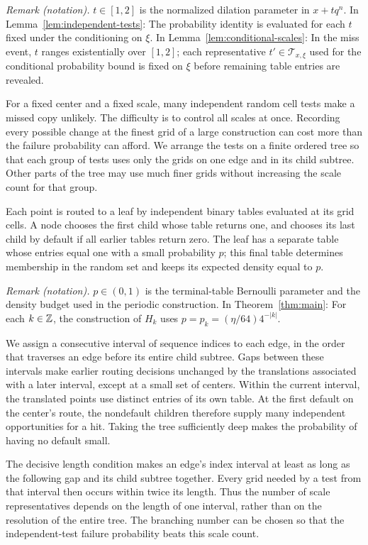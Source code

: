 \noindent\textit{Remark (notation).} $t\in[1,2]$ is the normalized dilation parameter in $x+tq^n$. In Lemma~\ref{lem:independent-tests}: The probability identity is evaluated for each $t$ fixed under the conditioning on $\xi$. In Lemma~\ref{lem:conditional-scales}: In the miss event, $t$ ranges existentially over $[1,2]$; each representative $t'\in\mathcal T_{x,\xi}$ used for the conditional probability bound is fixed on $\xi$ before remaining table entries are revealed.


For a fixed center and a fixed scale, many independent random cell
tests make a missed copy unlikely. The difficulty is to control all
scales at once. Recording every possible change at the finest grid
of a large construction can cost more than the failure probability
can afford. We arrange the tests on a finite ordered tree so that each
group of tests uses only the grids on one edge and in its child subtree.
Other parts of the tree may use much finer grids without increasing
the scale count for that group.

Each point is routed to a leaf by independent binary tables evaluated
at its grid cells. A node chooses the first child whose table returns
one, and chooses its last child by default if all earlier tables return
zero. The leaf has a separate table whose entries equal one with a
small probability $p$; this final table determines membership in the
random set and keeps its expected density equal to $p$.

\noindent\textit{Remark (notation).} $p\in(0,1)$ is the terminal-table Bernoulli parameter and the density budget used in the periodic construction. In Theorem~\ref{thm:main}: For each $k\in\mathbb Z$, the construction of $H_k$ uses $p=p_k=(\eta/64)4^{-|k|}$.


We assign a consecutive interval of sequence indices to each edge,
in the order that traverses an edge before its entire child subtree.
Gaps between these intervals make earlier routing decisions unchanged
by the translations associated with a later interval, except at a
small set of centers. Within the current interval, the translated
points use distinct entries of its own table. At the first default
on the center's route, the nondefault children therefore supply
many independent opportunities for a hit. Taking the tree sufficiently
deep makes the probability of having no default small.

The decisive length condition makes an edge's index interval at least
as long as the following gap and its child subtree together. Every
grid needed by a test from that interval then occurs within twice its
length. Thus the number of scale representatives depends on the
length of one interval, rather than on the resolution of the entire
tree. The branching number can be chosen so that the independent-test
failure probability beats this scale count.

